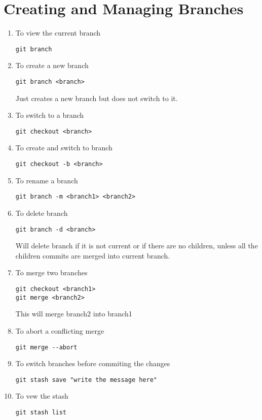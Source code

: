 \documentclass[paper=a4, fontsize=12pt]{scrartcl}
\begin{document}
\section*{Creating and Managing Branches}
\begin{enumerate}
\item To view the current branch
\begin{lstlisting}
git branch
\end{lstlisting}
\item To create a new branch
\begin{lstlisting}
git branch <branch>
\end{lstlisting}
Just creates a new branch but does not switch to it.
\item To switch to a branch
\begin{lstlisting}
git checkout <branch>
\end{lstlisting}
\item To create and switch to branch
\begin{lstlisting}
git checkout -b <branch>
\end{lstlisting}
\item To rename a branch
\begin{lstlisting}
git branch -m <branch1> <branch2>
\end{lstlisting}
\item To delete branch
\begin{lstlisting}
git branch -d <branch>
\end{lstlisting}
Will delete branch if it is not current or if there are no children, unless all the children commits are merged into current branch.
\item To merge two branches
\begin{lstlisting}
git checkout <branch1>
git merge <branch2>
\end{lstlisting}
This will merge branch2 into branch1
\item To abort a conflicting merge
\begin{lstlisting}
git merge --abort
\end{lstlisting}
\item To switch branches before commiting the changes
\begin{lstlisting}
git stash save "write the message here"
\end{lstlisting}
\item To vew the stash
\begin{lstlisting}
git stash list
\end{lstlisting}

\end{enumerate}
\end{document}
